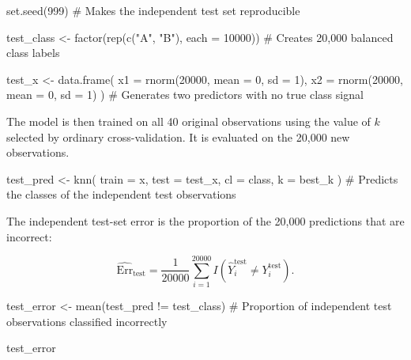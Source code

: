 \documentclass[
  letterpaper,
  DIV=11,
  numbers=noendperiod]{scrreprt}
\newenvironment{Shaded}{\begin{snugshade}}{\end{snugshade}}
\newcommand{\AttributeTok}[1]{\textcolor[rgb]{0.40,0.45,0.13}{#1}}
\newcommand{\CommentTok}[1]{\textcolor[rgb]{0.37,0.37,0.37}{#1}}
\newcommand{\DecValTok}[1]{\textcolor[rgb]{0.68,0.00,0.00}{#1}}
\newcommand{\FunctionTok}[1]{\textcolor[rgb]{0.28,0.35,0.67}{#1}}
\newcommand{\NormalTok}[1]{\textcolor[rgb]{0.00,0.23,0.31}{#1}}
\newcommand{\OtherTok}[1]{\textcolor[rgb]{0.00,0.23,0.31}{#1}}
\newcommand{\SpecialCharTok}[1]{\textcolor[rgb]{0.37,0.37,0.37}{#1}}
\newcommand{\StringTok}[1]{\textcolor[rgb]{0.13,0.47,0.30}{#1}}
\begin{document}
\begin{Shaded}
\begin{Highlighting}[]
\FunctionTok{set.seed}\NormalTok{(}\DecValTok{999}\NormalTok{) }\CommentTok{\# Makes the independent test set reproducible}

\NormalTok{test\_class }\OtherTok{\textless{}{-}} \FunctionTok{factor}\NormalTok{(}\FunctionTok{rep}\NormalTok{(}\FunctionTok{c}\NormalTok{(}\StringTok{"A"}\NormalTok{, }\StringTok{"B"}\NormalTok{), }\AttributeTok{each =} \DecValTok{10000}\NormalTok{)) }\CommentTok{\# Creates 20,000 balanced class labels}

\NormalTok{test\_x }\OtherTok{\textless{}{-}} \FunctionTok{data.frame}\NormalTok{(}
  \AttributeTok{x1 =} \FunctionTok{rnorm}\NormalTok{(}\DecValTok{20000}\NormalTok{, }\AttributeTok{mean =} \DecValTok{0}\NormalTok{, }\AttributeTok{sd =} \DecValTok{1}\NormalTok{),}
  \AttributeTok{x2 =} \FunctionTok{rnorm}\NormalTok{(}\DecValTok{20000}\NormalTok{, }\AttributeTok{mean =} \DecValTok{0}\NormalTok{, }\AttributeTok{sd =} \DecValTok{1}\NormalTok{)}
\NormalTok{) }\CommentTok{\# Generates two predictors with no true class signal}
\end{Highlighting}
\end{Shaded}

The model is then trained on all 40 original observations using the
value of \(k\) selected by ordinary cross-validation. It is evaluated on
the 20,000 new observations.

\begin{Shaded}
\begin{Highlighting}[]
\NormalTok{test\_pred }\OtherTok{\textless{}{-}} \FunctionTok{knn}\NormalTok{(}
  \AttributeTok{train =}\NormalTok{ x,}
  \AttributeTok{test =}\NormalTok{ test\_x,}
  \AttributeTok{cl =}\NormalTok{ class,}
  \AttributeTok{k =}\NormalTok{ best\_k}
\NormalTok{) }\CommentTok{\# Predicts the classes of the independent test observations}
\end{Highlighting}
\end{Shaded}

The independent test-set error is the proportion of the 20,000
predictions that are incorrect:

\[
\widehat{\mathrm{Err}}_{\mathrm{test}}
=
\frac{1}{20000}
\sum_{i=1}^{20000}
I(\widehat{Y}_i^{\mathrm{test}} \neq Y_i^{\mathrm{test}}).
\]

\begin{Shaded}
\begin{Highlighting}[]
\NormalTok{test\_error }\OtherTok{\textless{}{-}} \FunctionTok{mean}\NormalTok{(test\_pred }\SpecialCharTok{!=}\NormalTok{ test\_class) }\CommentTok{\# Proportion of independent test observations classified incorrectly}

\NormalTok{test\_error}
\end{Highlighting}
\end{Shaded}
\end{document}

